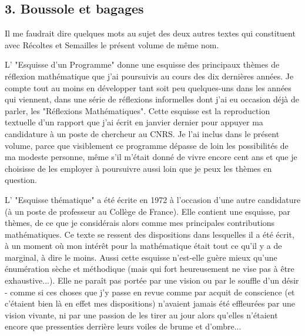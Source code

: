 \subsection{3. Boussole et bagages}

Il me faudrait dire quelques mots au sujet des deux autres textes qui constituent avec Récoltes et Semailles le présent volume de même nom.

L' "Esquisse d'un Programme" donne une esquisse des principaux thèmes de réflexion mathématique que j'ai poursuivis au cours des dix dernières années. Je compte tout au moins en développer tant soit peu quelques-uns dans les années qui viennent, dans une série de réflexions informelles dont j'ai eu occasion déjà de parler, les "Réflexions Mathématiques". Cette esquisse est la reproduction textuelle d'un rapport que j'ai écrit en janvier dernier pour appuyer ma candidature à un poste de chercheur au CNRS. Je l'ai inclus dans le présent volume, parce que visiblement ce programme dépasse de loin les possibilités de ma modeste personne, même s'il m'était donné de vivre encore cent ans et que je choisisse de les employer à poursuivre aussi loin que je peux les thèmes en question.

L' "Esquisse thématique" a été écrite en 1972 à l'occasion d'une autre candidature (à un poste de professeur au Collège de France). Elle contient une esquisse, par thèmes, de ce que je considérais alors comme mes principales contributions mathématiques. Ce texte se ressent des dispositions dans lesquelles il a été écrit, à un moment où mon intérêt pour la mathématique était tout ce qu'il y a de marginal, à dire le moins. Aussi cette esquisse n'est-elle guère mieux qu'une énumération sèche et méthodique (mais qui fort heureusement ne vise pas à être exhaustive...). Elle ne paraît pas portée par une vision ou par le souffle d'un désir - comme si ces choses que j'y passe en revue comme par acquit de conscience (et c'étaient bien là en effet mes dispositions) n'avaient jamais été effleurées par une vision vivante, ni par une passion de les tirer au jour alors qu'elles n'étaient encore que pressenties derrière leurs voiles de brume et d'ombre...

